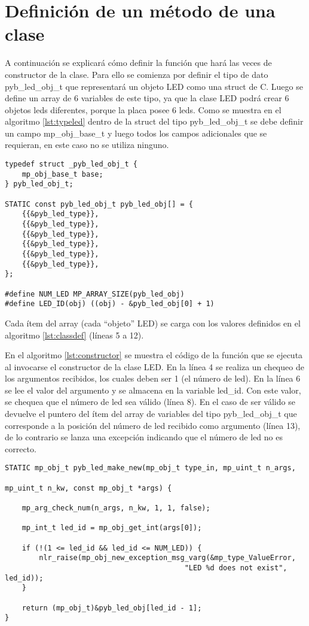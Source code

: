 \section{Definición de un método de una clase}

A continuación se explicará cómo definir la función que hará las veces de constructor de la clase. Para ello se comienza por definir el tipo de dato pyb\_led\_obj\_t que representará un objeto LED como una struct de C.
Luego se define un array de 6 variables de este tipo, ya que la clase LED podrá crear 6 objetos leds diferentes, porque la placa posee 6 leds. Como se muestra en el algoritmo \ref{lst:typeled} dentro de la struct del tipo pyb\_led\_obj\_t se debe definir un campo mp\_obj\_base\_t y luego todos los campos adicionales que se requieran, en este caso no se utiliza ninguno.

\begin{lstlisting}[label={lst:typeled},caption=Definición de un array de objetos LED para C.] 
typedef struct _pyb_led_obj_t {
    mp_obj_base_t base;
} pyb_led_obj_t;

STATIC const pyb_led_obj_t pyb_led_obj[] = {
    {{&pyb_led_type}},
    {{&pyb_led_type}},
    {{&pyb_led_type}},
    {{&pyb_led_type}},
    {{&pyb_led_type}},
    {{&pyb_led_type}},
};

#define NUM_LED MP_ARRAY_SIZE(pyb_led_obj)
#define LED_ID(obj) ((obj) - &pyb_led_obj[0] + 1)
\end{lstlisting}

Cada ítem del array (cada “objeto” LED) se carga con los valores definidos en el algoritmo \ref{lst:classdef} (líneas 5 a 12).

En el algoritmo \ref{lst:constructor} se muestra el código de la función que se ejecuta al invocarse el constructor de la clase LED. En la línea 4 se realiza un chequeo de los argumentos recibidos, los cuales deben ser 1 (el número de led). En la línea 6 se lee el valor del argumento y se almacena en la variable led\_id. Con este valor, se chequea que el número de led sea válido (línea 8). En el caso de ser válido se devuelve el puntero del ítem del array de variables del tipo pyb\_led\_obj\_t que corresponde a la posición del número de led recibido como argumento (línea 13), de lo contrario se lanza una excepción indicando que el número de led no es correcto.

\begin{lstlisting}[label={lst:constructor},caption=Definición de la función constructor.] 
STATIC mp_obj_t pyb_led_make_new(mp_obj_t type_in, mp_uint_t n_args, 
																 mp_uint_t n_kw, const mp_obj_t *args) {
																
    mp_arg_check_num(n_args, n_kw, 1, 1, false);
		
    mp_int_t led_id = mp_obj_get_int(args[0]);
		
    if (!(1 <= led_id && led_id <= NUM_LED)) {
        nlr_raise(mp_obj_new_exception_msg_varg(&mp_type_ValueError,
				                          "LED %d does not exist", led_id));
    }
		
    return (mp_obj_t)&pyb_led_obj[led_id - 1];
}
\end{lstlisting}

